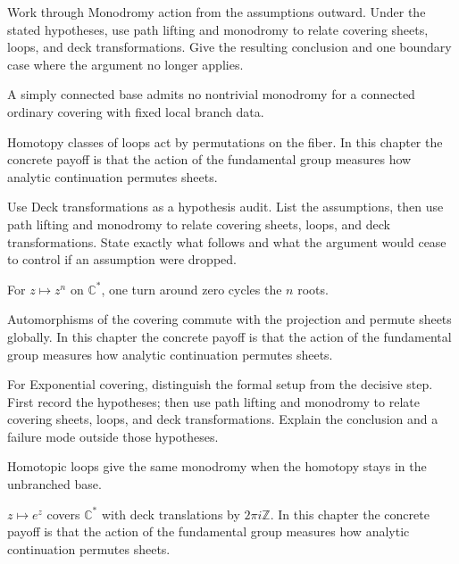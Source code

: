 \begin{exercise}\label{exr:iv23-05}
Work through Monodromy action from the assumptions outward. Under the stated hypotheses, use path lifting and monodromy to relate covering sheets, loops, and deck transformations. Give the resulting conclusion and one boundary case where the argument no longer applies.
\end{exercise}
\begin{hint}
A simply connected base admits no nontrivial monodromy for a connected ordinary covering with fixed local branch data.
\end{hint}
\begin{solution}
Homotopy classes of loops act by permutations on the fiber. In this chapter the concrete payoff is that the action of the fundamental group measures how analytic continuation permutes sheets.
\end{solution}

\begin{exercise}\label{exr:iv23-06}
Use Deck transformations as a hypothesis audit. List the assumptions, then use path lifting and monodromy to relate covering sheets, loops, and deck transformations. State exactly what follows and what the argument would cease to control if an assumption were dropped.
\end{exercise}
\begin{hint}
For \(z\mapsto z^n\) on \(\mathbb C^*\), one turn around zero cycles the \(n\) roots.
\end{hint}
\begin{solution}
Automorphisms of the covering commute with the projection and permute sheets globally. In this chapter the concrete payoff is that the action of the fundamental group measures how analytic continuation permutes sheets.
\end{solution}

\begin{exercise}\label{exr:iv23-07}
For Exponential covering, distinguish the formal setup from the decisive step. First record the hypotheses; then use path lifting and monodromy to relate covering sheets, loops, and deck transformations. Explain the conclusion and a failure mode outside those hypotheses.
\end{exercise}
\begin{hint}
Homotopic loops give the same monodromy when the homotopy stays in the unbranched base.
\end{hint}
\begin{solution}
$z\mapsto e^z$ covers $\mathbb C^*$ with deck translations by $2\pi i\mathbb Z$. In this chapter the concrete payoff is that the action of the fundamental group measures how analytic continuation permutes sheets.
\end{solution}

